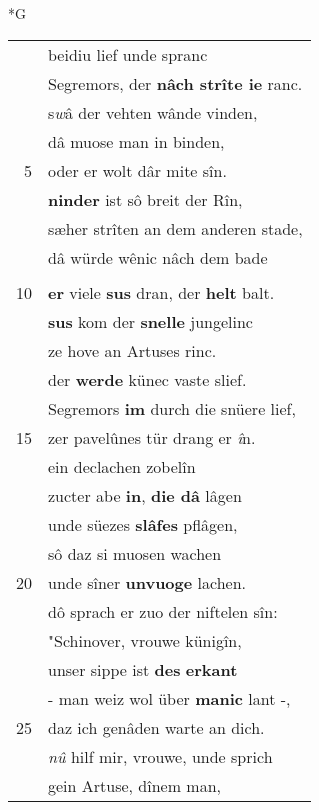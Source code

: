 \documentclass[8pt,a4paper,notitlepage]{article}
\begin{document}
\newpage
\begin{table}[ht]
\begin{minipage}[t]{0.5\linewidth}
\small
\begin{center}*G
\end{center}
\begin{tabular}{rl}
 & beidiu lief unde spranc\\ 
 & Segremors, der \textbf{nâch strîte ie} ranc.\\ 
 & s\textit{w}â der vehten wânde vinden,\\ 
 & dâ muose man in binden,\\ 
5 & oder er wolt dâr mite sîn.\\ 
 & \textbf{ninder} ist sô breit der Rîn,\\ 
 & sæher strîten an dem anderen stade,\\ 
 & dâ würde wênic nâch dem bade\\ 
 & \textbf{\begin{large}G\end{large}erastet}, ez wære warm oder kalt:\\ 
10 & \textbf{er} viele \textbf{sus} dran, der \textbf{helt} balt.\\ 
 & \textbf{sus} kom der \textbf{snelle} jungelinc\\ 
 & ze hove an Artuses rinc.\\ 
 & der \textbf{werde} künec vaste slief.\\ 
 & Segremors \textbf{im} durch die snüere lief,\\ 
15 & zer pavelûnes tür drang er \textit{î}n.\\ 
 & ein declachen zobelîn\\ 
 & zucter abe \textbf{in}, \textbf{die dâ} lâgen\\ 
 & unde süezes \textbf{slâfes} pflâgen,\\ 
 & sô daz si muosen wachen\\ 
20 & unde sîner \textbf{unvuoge} lachen.\\ 
 & dô sprach er zuo der niftelen sîn:\\ 
 & "Schinover, vrouwe künigîn,\\ 
 & unser sippe ist \textbf{des} \textbf{erkant}\\ 
 & - man weiz wol über \textbf{manic} lant -,\\ 
25 & daz ich genâden warte an dich.\\ 
 & \textit{nû} hilf mir, vrouwe, unde sprich\\ 
 & gein Artuse, dînem man,\\ 

\end{tabular}
\end{minipage}
\end{table}
\end{document}
